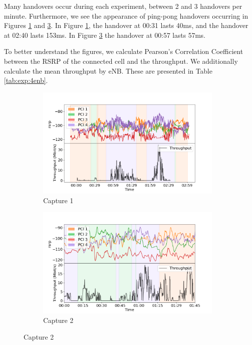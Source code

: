 Many handovers occur during each experiment, between 2 and 3 handovers per minute. Furthermore, we see the appearance of ping-pong handovers occurring in Figures \ref{fig:real:4enb:walk:1} and \ref{fig:real:4enb:walk:2}. In Figure \ref{fig:real:4enb:walk:1}, the handover at 00:31 lasts 40ms, and the handover at 02:40 lasts 153ms. In Figure \ref{fig:real:4enb:walk:2} the handover at 00:57 lasts 57ms.

To better understand the figures, we calculate Pearson's Correlation Coefficient between the RSRP of the connected cell and the throughput. We additionally calculate the mean throughput by eNB. These are presented in Table \ref{tab:exp:4enb}.

\begin{figure}
    \centering
    \caption{Moving Capture of Throughput (1)}
    \label{fig:real:4enb:walk:sup1}
    \begin{subfigure}{\linewidth}
        \centering
        \includegraphics[width=0.9\linewidth]{src/img/4NEW1.png}
        \caption{Capture 1}
        \label{fig:real:4enb:walk:1}
    \end{subfigure}
    \begin{subfigure}{\linewidth}
        \centering
        \includegraphics[width=0.9\linewidth]{src/img/3NEW2.png}
        \caption{Capture 2}
        \label{fig:real:4enb:walk:2}
    \end{subfigure}
\end{figure}

